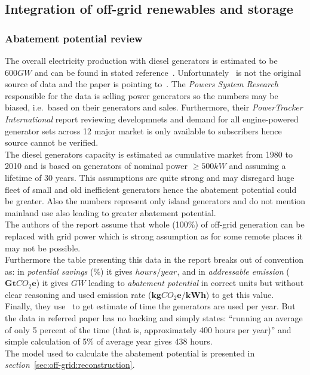\documentclass[11pt, twocolumn]{article}
\begin{document}
\subsection{Integration of off-grid renewables and storage}
\subsubsection{Abatement potential review}
The overall electricity production with diesel generators is estimated to be $600 GW$ and can be found in stated reference~\citep{pieper2011revisiting}. Unfortunately~\citep{pieper2011revisiting} is not the original source of data and the paper is pointing to~\citep{PowersSystemResearch}. The \emph{Powers System Research} responsible for the data is selling power generators so the numbers may be biased, i.e.\ based on their generators and sales. Furthermore, their \emph{PowerTracker International} report reviewing developmnets and demand for all engine-powered generator sets across 12 major market is only available to subscribers hence source cannot be verified.\\
The diesel generators capacity is estimated as cumulative market from 1980 to 2010 and is based on generators of nominal power $\geq 500kW$ and assuming a lifetime of 30 years. This assumptions are quite strong and may disregard huge fleet of small and old inefficient generators hence the abatement potential could be greater. Also the numbers represent only island generators and do not mention mainland use also leading to greater abatement potential.\\
The authors of the report assume that whole (100\%) of off-grid generation can be replaced with grid power which is strong assumption as for some remote places it may not be possible.\\
Furthermore the table presenting this data in the report breaks out of convention as: in \emph{potential savings} (\%) it gives $hours/year$, and in \emph{addressable emission} ($\mathbf{Gt}CO_2\mathbf{e}$) it gives $GW$ leading to \emph{abatement potential} in correct units but without clear reasoning and used emission rate ($\mathbf{kg}CO_2\mathbf{e}/\mathbf{kWh}$) to get this value.\\
Finally, they use~\citep{pieper2011revisiting} to get estimate of time the generators are used per year. But the data in referred paper has no backing and simply states: ``running an average of only 5 percent of the time (that is, approximately 400 hours per year)'' and simple calculation of 5\% of average year gives 438 hours.\\
The model used to calculate the abatement potential is presented in \emph{section}~\ref{sec:off-grid:reconstruction}.\\
\end{document}
